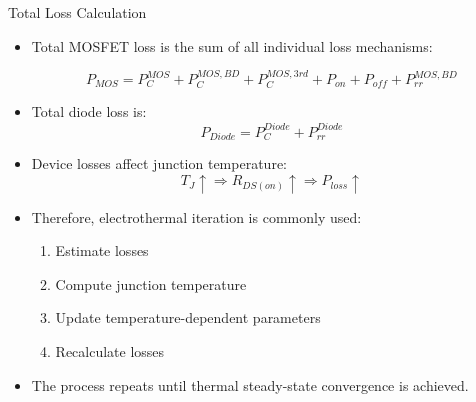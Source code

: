 \begin{frame}{Total Loss Calculation}
\begin{itemize}
    \item Total MOSFET loss is the sum of all individual loss mechanisms:
    
    \[
    P_{MOS}
    =
    P_C^{MOS}
    +
    P_C^{MOS,BD}
    +
    P_C^{MOS,3rd}
    +
    P_{on}
    +
    P_{off}
    +
    P_{rr}^{MOS,BD}
    \]

    \item Total diode loss is:
    \[
    P_{Diode}
    =
    P_C^{Diode}
    +
    P_{rr}^{Diode}
    \]

    \item Device losses affect junction temperature:
    \[
    T_J \uparrow
    \Rightarrow
    R_{DS(on)} \uparrow
    \Rightarrow
    P_{loss} \uparrow
    \]

    \item Therefore, electrothermal iteration is commonly used:
    \begin{enumerate}
        \item Estimate losses
        \item Compute junction temperature
        \item Update temperature-dependent parameters
        \item Recalculate losses
    \end{enumerate}

    \item The process repeats until thermal steady-state convergence is achieved.
\end{itemize}
\end{frame}



